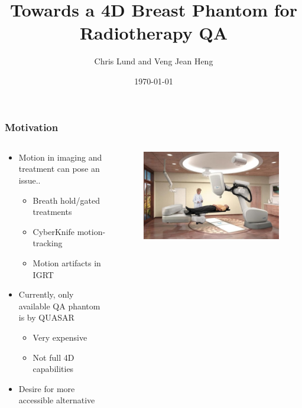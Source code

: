 \documentclass{beamer}
\title[4D Breast Phantom]{Towards a 4D Breast Phantom for Radiotherapy QA}
\author[C. Lund, V.J. Heng]{Chris Lund and Veng Jean Heng}
\institute[McGill MPU]{Medical Physics Unit \\ Department of Oncology, McGill University}
\date{\today}
\begin{document}
\begin{frame}

    \maketitle

\end{frame}

\begin{frame}

    \frametitle{Motivation}

    \begin{columns}
        \begin{column}{0.5\textwidth}
            \begin{itemize}
                \item Motion in imaging and treatment can pose an issue..
                    \begin{itemize}
                        \item Breath hold/gated treatments
                        \item CyberKnife motion-tracking
                        \item Motion artifacts in IGRT
                    \end{itemize}
                \vspace{1em}
                \item Currently, only available QA phantom is by QUASAR
                    \begin{itemize}
                        \item Very expensive
                        \item Not full 4D capabilities
                    \end{itemize}
                    \vspace{1em}
                \item Desire for more accessible alternative
            \end{itemize}
        \end{column}
        \begin{column}{0.5\textwidth}
            \vspace*{-1.5em}
            \begin{figure}[h]
                \centering
                \includegraphics[width=0.9\columnwidth]{cyberknife.jpeg}

\end{figure}
\end{column}
\end{columns}
\end{frame}
\end{document}
